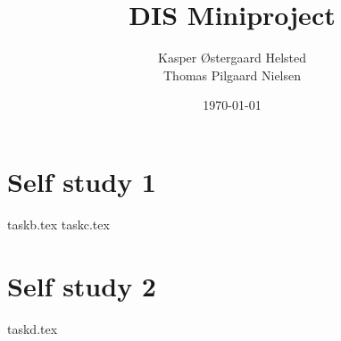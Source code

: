 \documentclass[twoside]{report}
\begin{document}
\pagestyle{empty} %
%
%

\title{DIS Miniproject}
\date{\today}
\author{Kasper Østergaard Helsted \\ Thomas Pilgaard Nielsen}

\maketitle

%
%


\chapter{Self study 1}
{taskb.tex}
{taskc.tex}
\chapter{Self study 2}
{taskd.tex}

\end{document}
